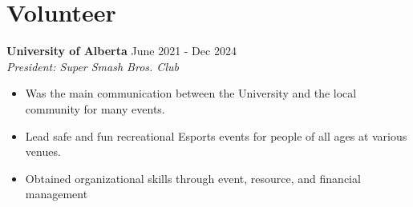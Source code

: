 \documentclass[letterpaper, 10pt]{article}
\newcommand{\secStartSpace}{\vspace{3pt}}
\newcommand{\secEndSpace}{\vspace{5pt}}
\newcommand{\workHeader}[3]{
\noindent \large{\textbf{\textcolor{TextColor}{#1}}} \hfill \normalsize{#3}\vspace{2pt}\\
	\textit{#2}\vspace{-2pt}
}
\begin{document}
\section{\color{blue} \textbf{Volunteer}}
\secStartSpace

\begin{addmargin}[0.5em]{1em}
	\workHeader{University of Alberta}{President: Super Smash Bros. Club}{June 2021 - Dec 2024}
	\begin{itemize}
        \item Was the main communication between the University and the local community for many events.
        \item Lead safe and fun recreational Esports events for people of all ages at various venues.
        \item Obtained organizational skills through event, resource, and financial management
    \end{itemize}
\end{addmargin}
\secEndSpace
\secEndSpace
\end{document}
